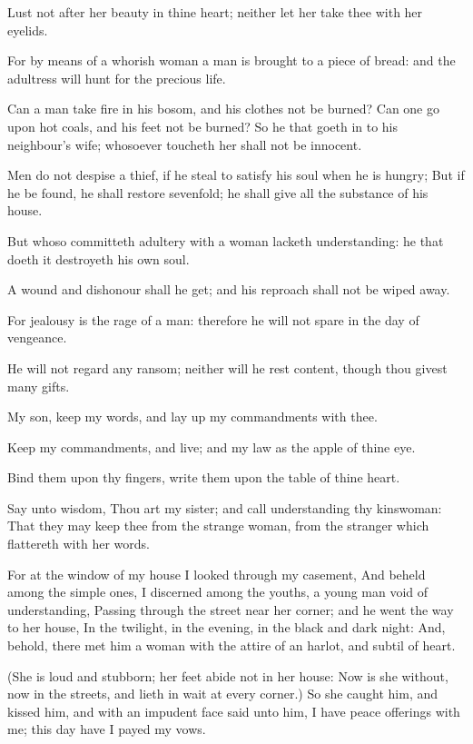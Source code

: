 \Verse Lust not after her beauty in thine heart; neither let her take thee with her eyelids.

\Verse For by means of a whorish woman a man is brought to a piece of bread: and the adultress will hunt for the precious life.

\Verse Can a man take fire in his bosom, and his clothes not be burned?  \Verse Can one go upon hot coals, and his feet not be burned?  \Verse So he that goeth in to his neighbour's wife; whosoever toucheth her shall not be innocent.

\Verse Men do not despise a thief, if he steal to satisfy his soul when he is hungry; \Verse But if he be found, he shall restore sevenfold; he shall give all the substance of his house.

\Verse But whoso committeth adultery with a woman lacketh understanding: he that doeth it destroyeth his own soul.

\Verse A wound and dishonour shall he get; and his reproach shall not be wiped away.

\Verse For jealousy is the rage of a man: therefore he will not spare in the day of vengeance.

\Verse He will not regard any ransom; neither will he rest content, though thou givest many gifts.


\Chapter
\Verse My son, keep my words, and lay up my commandments with thee.

\Verse Keep my commandments, and live; and my law as the apple of thine eye.

\Verse Bind them upon thy fingers, write them upon the table of thine heart.

\Verse Say unto wisdom, Thou art my sister; and call understanding thy kinswoman: \Verse That they may keep thee from the strange woman, from the stranger which flattereth with her words.

\Verse For at the window of my house I looked through my casement, \Verse And beheld among the simple ones, I discerned among the youths, a young man void of understanding, \Verse Passing through the street near her corner; and he went the way to her house, \Verse In the twilight, in the evening, in the black and dark night: \Verse And, behold, there met him a woman with the attire of an harlot, and subtil of heart.

\Verse (She is loud and stubborn; her feet abide not in her house: \Verse Now is she without, now in the streets, and lieth in wait at every corner.)  \Verse So she caught him, and kissed him, and with an impudent face said unto him, \Verse I have peace offerings with me; this day have I payed my vows.

